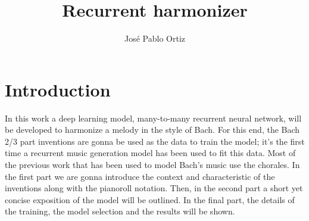 \documentclass{article}
\begin{document}
\title{Recurrent harmonizer}

\author{José Pablo Ortiz}
\maketitle
\section*{Introduction}
In this work a deep learning model, many-to-many recurrent neural network, will be developed to harmonize a melody in the style of Bach. For this end, the Bach 2/3 part inventions are gonna be used as the data to train the model; it's the first time a recurrent music generation model has been used to fit this data. Most of the previous work that has been used to model Bach's music use the chorales.
\noindent
In the first part we are gonna introduce the context and characteristic of the inventions along with the pianoroll notation. Then, in the second part a short yet concise exposition of the model will be outlined. In the final part, the details of the training, the model selection and the results will be shown.
\end{document}
